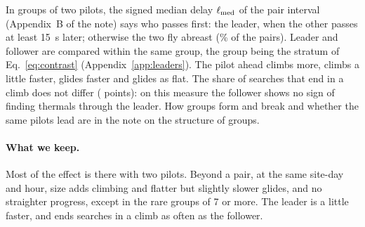 In groups of two pilots, the signed median delay $\ell_{\rm med}$ of the pair interval
(Appendix~B of the note) says who passes first: the leader, when the other passes at least 15~s later;
otherwise the two fly abreast (\Abreast\% of the pairs). Leader and follower are compared within the
same group, the group being the stratum of Eq.~\eqref{eq:contrast}
(Appendix~\ref{app:leaders}). The pilot ahead climbs more, climbs a little faster, glides faster and
glides as flat. The share of searches that end in a climb does not differ (\LeadFound{}
points): on this measure the follower shows no sign of finding thermals through the leader. How
groups form and break and whether the same pilots lead are in the note on the structure of groups.

\paragraph{What we keep.} Most of the effect is there with two pilots. Beyond a pair, at the same
site-day and hour, size adds climbing and flatter but slightly slower glides, and no straighter
progress, except in the rare groups of 7 or more. The leader is a little faster, and ends searches in a climb as often
as the follower.
